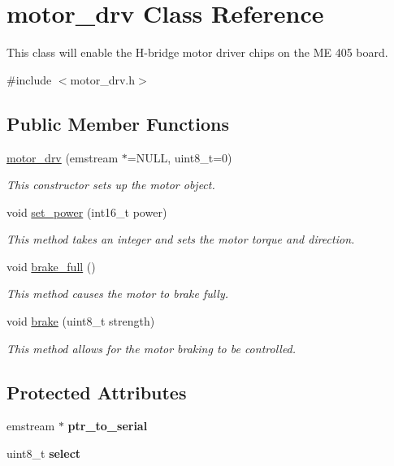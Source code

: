 \hypertarget{classmotor__drv}{\section{motor\-\_\-drv Class Reference}
\label{classmotor__drv}
}


This class will enable the H-\/bridge motor driver chips on the M\-E 405 board.  




{\ttfamily \#include $<$motor\-\_\-drv.\-h$>$}

\subsection*{Public Member Functions}
\begin{DoxyCompactItemize}
\item 
\hyperlink{classmotor__drv_a13875fc8133ee2c8af383c4316278d84}{motor\-\_\-drv} (emstream $\ast$=N\-U\-L\-L, uint8\-\_\-t=0)
\begin{DoxyCompactList}\small\item\em This constructor sets up the motor object. \end{DoxyCompactList}\item 
void \hyperlink{classmotor__drv_a4b6d6fc9698bf76b9bf1bcbb660ad3b7}{set\-\_\-power} (int16\-\_\-t power)
\begin{DoxyCompactList}\small\item\em This method takes an integer and sets the motor torque and direction. \end{DoxyCompactList}\item 
void \hyperlink{classmotor__drv_ab9d99a1b71f8515240ff7748a16c937b}{brake\-\_\-full} ()
\begin{DoxyCompactList}\small\item\em This method causes the motor to brake fully. \end{DoxyCompactList}\item 
void \hyperlink{classmotor__drv_abf63b3c932b836bc3f97ebda5fd7e762}{brake} (uint8\-\_\-t strength)
\begin{DoxyCompactList}\small\item\em This method allows for the motor braking to be controlled. \end{DoxyCompactList}\end{DoxyCompactItemize}
\subsection*{Protected Attributes}
\begin{DoxyCompactItemize}
\item 
\hypertarget{classmotor__drv_a9cd3052255589d1849217279b4b6e337}{emstream $\ast$ {\bfseries ptr\-\_\-to\-\_\-serial}}\label{classmotor__drv_a9cd3052255589d1849217279b4b6e337}

\item 
\hypertarget{classmotor__drv_aca3c3dd889fd865607e312faf0e76c65}{uint8\-\_\-t {\bfseries select}}\label{classmotor__drv_aca3c3dd889fd865607e312faf0e76c65}

\end{DoxyCompactItemize}


